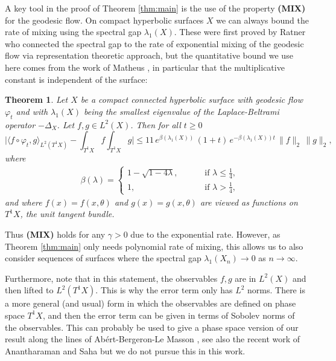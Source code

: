 \documentclass[11pt,twoside,reqno]{amsart}
\newcommand{\1}{\mathrm{\mathbf{1}}}
\numberwithin{equation}{section}
\theoremstyle{plain}
\newtheorem{theorem}[thm]{Theorem}
\theoremstyle{definition}
\theoremstyle{remark}
\begin{document}
A key tool in the proof of Theorem \ref{thm:main} is the use of the property \textbf{(MIX)} for the geodesic flow. On compact hyperbolic surfaces $X$ we can always bound the rate of mixing using the spectral gap $\lambda_1(X)$. These were first proved by Ratner \cite{Ratner} who connected the spectral gap to the rate of exponential mixing of the geodesic flow via representation theoretic approach, but the quantitative bound we use here comes from the work of Matheus \cite{Matheus}, in particular that the multiplicative constant is independent of the surface:

\begin{theorem}
\label{Thm: Exponential mixing}
Let $X$ be a compact connected hyperbolic surface with geodesic flow $ \varphi_{t} $ and with $\lambda_1( X )$ being the smallest eigenvalue of the Laplace-Beltrami operator $ -\Delta_X $. Let $f,g \in L^2(X)$. Then for all $t \ge 0$
\[
\bigg| \big\langle f \circ \varphi_t, g \big\rangle_{L^2(T^1X)} 
- \int_{T^1X} f \int_{T^1X} g \bigg|
\leq 11 \, e^{ \beta( \lambda_{1}( X ) ) } \, ( 1 + t ) \, e^{- \beta(\lambda_1( X ) ) t} \, 
\|f\|_2 \, \|g\|_2,
\]
where
\begin{align*}
	&
	\beta( \lambda ) = 
	\begin{cases}	
		1 - \sqrt{1 - 4\lambda}, \qquad & \text{ if } \lambda \leq \frac{1}{4},
		\\
		1, \qquad & \text{ if } \lambda > \frac{1}{4},
	\end{cases}
\end{align*}
and where $f(x) = f(x,\theta)$ and $g(x) = g(x,\theta)$ are viewed as functions on $T^1X$, the unit tangent bundle.
\end{theorem}

Thus \textbf{(MIX)} holds for any $\gamma > 0$ due to the exponential rate. However, as Theorem \ref{thm:main} only needs polynomial rate of mixing, this allows us to also consider sequences of surfaces where the spectral gap $\lambda_1(X_n) \to 0$ as $n \to \infty$.

Furthermore, note that in this statement, the observables $f, g$ are in $L^2(X)$ and then lifted to $L^2(T^1X)$. This is why the error term only has $L^2$ norms. There is a more general (and usual) form in which the observables are defined on phase space $T^1 X$, and then the error term can be given in terms of Sobolev norms of the observables. This can probably be used to give a phase space version of our result along the lines of Abért-Bergeron-Le Masson \cite{abertEigenfunctionsRandomWaves2018}, see also the recent work of Anantharaman and Saha \cite{AnantharamanSaha} but we do not pursue this in this work.
\end{document}
